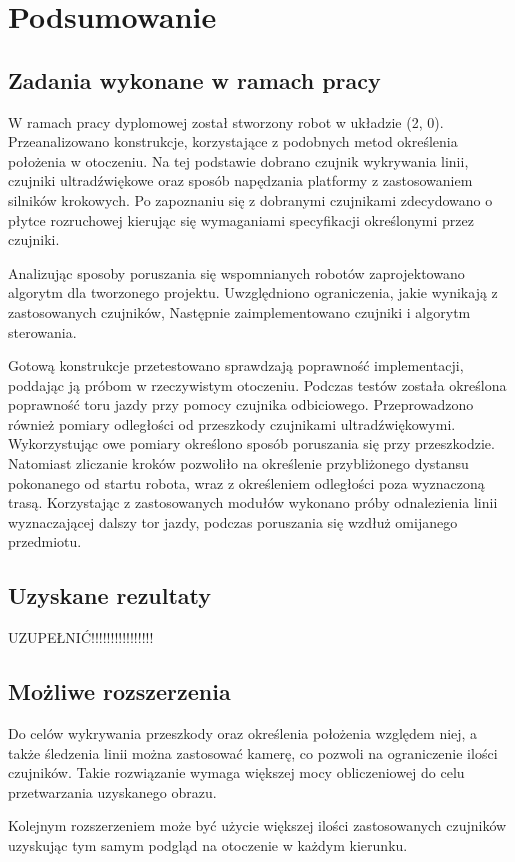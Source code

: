 \chapter{Podsumowanie}
\section{Zadania wykonane w ramach pracy}
W ramach pracy dyplomowej został stworzony robot w układzie (2, 0). Przeanalizowano konstrukcje, korzystające z podobnych metod określenia położenia w otoczeniu. Na tej podstawie dobrano czujnik wykrywania linii, czujniki ultradźwiękowe oraz sposób napędzania platformy z zastosowaniem silników krokowych. Po zapoznaniu się z dobranymi czujnikami zdecydowano o płytce rozruchowej kierując się wymaganiami specyfikacji określonymi przez czujniki.

Analizując sposoby poruszania się wspomnianych robotów zaprojektowano algorytm dla tworzonego projektu. Uwzględniono ograniczenia, jakie wynikają z zastosowanych czujników, Następnie zaimplementowano czujniki i algorytm sterowania. 

Gotową konstrukcje przetestowano sprawdzają poprawność implementacji, poddając ją próbom w rzeczywistym otoczeniu. Podczas testów została określona poprawność toru jazdy przy pomocy czujnika odbiciowego. Przeprowadzono również pomiary odległości od przeszkody czujnikami ultradźwiękowymi. Wykorzystując owe pomiary określono sposób poruszania się przy przeszkodzie. Natomiast zliczanie kroków pozwoliło na określenie przybliżonego dystansu pokonanego od startu robota, wraz z określeniem odległości poza wyznaczoną trasą. Korzystając z zastosowanych modułów wykonano próby odnalezienia linii wyznaczającej dalszy tor jazdy, podczas poruszania się wzdłuż omijanego przedmiotu.

\section{Uzyskane rezultaty}
UZUPEŁNIĆ!!!!!!!!!!!!!!!!

\section{Możliwe rozszerzenia}
Do celów wykrywania przeszkody oraz określenia położenia względem niej, a także śledzenia linii można zastosować kamerę, co pozwoli na ograniczenie ilości czujników. Takie rozwiązanie wymaga większej mocy obliczeniowej do celu przetwarzania uzyskanego obrazu.

Kolejnym rozszerzeniem może być użycie większej ilości zastosowanych czujników uzyskując tym samym podgląd na otoczenie w każdym kierunku.